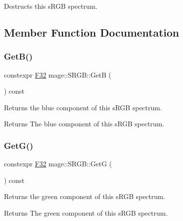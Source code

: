 Destructs this s\+R\+GB spectrum. 

\subsection{Member Function Documentation}
\mbox{\label{structmage_1_1_s_r_g_b_afc01b8a11b3033ba21e6c5945359a421}} 
\subsubsection{\texorpdfstring{Get\+B()}{GetB()}}
{\footnotesize\ttfamily constexpr \mbox{\hyperlink{namespacemage_aa97e833b45f06d60a0a9c4fc22ae02c0}{F32}} mage\+::\+S\+R\+G\+B\+::\+GetB (\begin{DoxyParamCaption}{ }\end{DoxyParamCaption}) const\hspace{0.3cm}{\ttfamily [noexcept]}}

Returns the blue component of this s\+R\+GB spectrum.

\begin{DoxyReturn}{Returns}
The blue component of this s\+R\+GB spectrum. 
\end{DoxyReturn}
\mbox{\label{structmage_1_1_s_r_g_b_a32cd65345a812c31b182d6ccaa47bab6}} 
\subsubsection{\texorpdfstring{Get\+G()}{GetG()}}
{\footnotesize\ttfamily constexpr \mbox{\hyperlink{namespacemage_aa97e833b45f06d60a0a9c4fc22ae02c0}{F32}} mage\+::\+S\+R\+G\+B\+::\+GetG (\begin{DoxyParamCaption}{ }\end{DoxyParamCaption}) const\hspace{0.3cm}{\ttfamily [noexcept]}}

Returns the green component of this s\+R\+GB spectrum.

\begin{DoxyReturn}{Returns}
The green component of this s\+R\+GB spectrum. 
\end{DoxyReturn}
\mbox{\label{structmage_1_1_s_r_g_b_a0089fdce78dc4da495323f0f6a162546}} 
